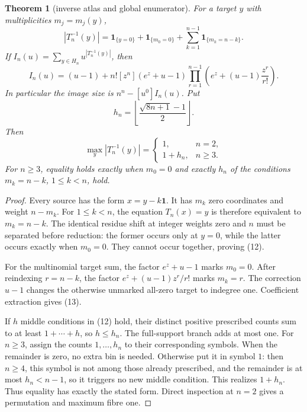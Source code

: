 \documentclass[a4paper,10pt]{amsart}
\newtheorem{theorem}{Theorem}
\theoremstyle{remark}
\newcommand{\one}{\mathbf 1}
\begin{document}
\begin{theorem}[inverse atlas and global enumerator]\label{thm:fibre}
For a target $y$ with multiplicities $m_j=m_j(y)$,
\begin{equation}
 |T_n^{-1}(y)|=\mathbf1_{\{y=0\}}+\mathbf1_{\{m_0=0\}}
 +\sum_{k=1}^{n-1}\mathbf1_{\{m_k=n-k\}}.             \label{eq:fibre}
\end{equation}
If $I_n(u)=\sum_{y\in H_n}u^{|T_n^{-1}(y)|}$, then
\begin{equation}
 I_n(u)=(u-1)+n![z^n](e^z+u-1)
 \prod_{r=1}^{n-1}\left(e^z+(u-1)\frac{z^r}{r!}\right). \label{eq:egf}
\end{equation}
In particular the image size is $n^n-[u^0]I_n(u)$.  Put
\[
 h_n=\left\lfloor\frac{\sqrt{8n+1}-1}{2}\right\rfloor.
\]
Then
\begin{equation}
 \max_y|T_n^{-1}(y)|=
 \begin{cases}1,&n=2,\\1+h_n,&n\geq3.\end{cases}      \label{eq:maxfibre}
\end{equation}
For $n\geq3$, equality holds exactly when $m_0=0$ and exactly $h_n$ of
the conditions $m_k=n-k$, $1\leq k<n$, hold.
\end{theorem}

\begin{proof}
Every source has the form $x=y-k\one$.  It has $m_k$ zero coordinates and
weight $n-m_k$.  For $1\leq k<n$, the equation $T_n(x)=y$ is therefore
equivalent to $m_k=n-k$.  The identical residue shift at integer weights
zero and $n$ must be separated before reduction: the former occurs only
at $y=0$, while the latter occurs exactly when $m_0=0$.  They cannot occur
together, proving (12).

For the multinomial target sum, the factor $e^z+u-1$ marks $m_0=0$.
After reindexing $r=n-k$, the factor
$e^z+(u-1)z^r/r!$ marks $m_k=r$.  The correction $u-1$ changes the otherwise
unmarked all-zero target to indegree one.  Coefficient extraction gives
(13).

If $h$ middle conditions in (12) hold, their distinct positive prescribed
counts sum to at least $1+\cdots+h$, so $h\leq h_n$.  The full-support
branch adds at most one.  For $n\geq3$, assign the counts
$1,\ldots,h_n$ to their corresponding symbols.  When the remainder is
zero, no extra bin is needed.  Otherwise put it in symbol $1$: then
$n\geq4$, this symbol is not among those already prescribed, and the
remainder is at most $h_n<n-1$, so it triggers no new middle condition.
This realizes $1+h_n$.  Thus equality has
exactly the stated form.  Direct inspection at $n=2$ gives a permutation
and maximum fibre one.
\end{proof}
\end{document}
